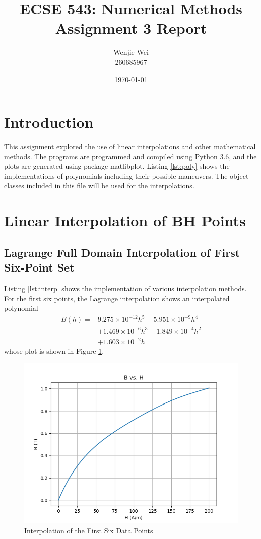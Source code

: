\documentclass[a4paper,titlepage]{article}
\title{\textbf{ECSE 543: Numerical Methods} \\ Assignment 3 Report}
\author{Wenjie Wei \\ 260685967}
\date{\today}
\begin{document}
	\sloppy
	\maketitle
	
	\tableofcontents
	\newpage
	
	\twocolumn
	\section*{Introduction}
		This assignment explored the use of linear interpolations and other mathematical methods. The programs are programmed and compiled using Python 3.6, and the plots are generated using package matlibplot. Listing \ref{lst:poly} shows the implementations of polynomials including their possible maneuvers. The object classes included in this file will be used for the interpolations. 
		
	\section{Linear Interpolation of BH Points}
		\subsection{Lagrange Full Domain Interpolation of First Six-Point Set}
			Listing \ref{lst:interp} shows the implementation of various interpolation methods. For the first six points, the Lagrange interpolation shows an interpolated polynomial
			\begin{align*}
				B(h) = &9.275\times 10^{-12}h^5 - 5.951\times 10^{-9}h^4 \\
					   &+ 1.469\times 10^{-6}h^3 - 1.849\times 10^{-4}h^2 \\
					   &+ 1.603\times 10^{-2}h
			\end{align*}
			whose plot is shown in Figure \ref{bh_first6}. 
			\begin{figure}[!h]
				\centering
				\includegraphics[width=\linewidth]{../data/B_H_first_six}
				\caption{Interpolation of the First Six Data Points}
				\label{bh_first6}
			\end{figure}
		
\end{document}
